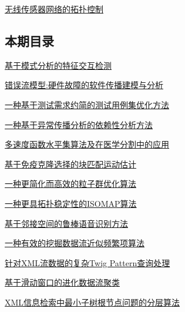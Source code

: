 \documentclass[a4paper]{article}
\begin{document}
\href{http://www.jos.org.cn/ch/reader/download_pdf.aspx?file_no=20070416&year_id=2007&quarter_id=4&falg=1}{无线传感器网络的拓扑控制}

\subsection{本期目录}
\href{http://www.jos.org.cn/ch/reader/download_pdf.aspx?file_no=20070402&year_id=2007&quarter_id=4&falg=1}{基于模式分析的特征交互检测}

\href{http://www.jos.org.cn/ch/reader/download_pdf.aspx?file_no=20070403&year_id=2007&quarter_id=4&falg=1}{错误流模型:硬件故障的软件传播建模与分析}

\href{http://www.jos.org.cn/ch/reader/download_pdf.aspx?file_no=20070404&year_id=2007&quarter_id=4&falg=1}{一种基于测试需求约简的测试用例集优化方法}

\href{http://www.jos.org.cn/ch/reader/download_pdf.aspx?file_no=20070405&year_id=2007&quarter_id=4&falg=1}{一种基于异常传播分析的依赖性分析方法}

\href{http://www.jos.org.cn/ch/reader/download_pdf.aspx?file_no=20070406&year_id=2007&quarter_id=4&falg=1}{多速度函数水平集算法及在医学分割中的应用}

\href{http://www.jos.org.cn/ch/reader/download_pdf.aspx?file_no=20070407&year_id=2007&quarter_id=4&falg=1}{基于免疫克隆选择的块匹配运动估计}

\href{http://www.jos.org.cn/ch/reader/download_pdf.aspx?file_no=20070408&year_id=2007&quarter_id=4&falg=1}{一种更简化而高效的粒子群优化算法}

\href{http://www.jos.org.cn/ch/reader/download_pdf.aspx?file_no=20070409&year_id=2007&quarter_id=4&falg=1}{一种更具拓扑稳定性的ISOMAP算法}

\href{http://www.jos.org.cn/ch/reader/download_pdf.aspx?file_no=20070410&year_id=2007&quarter_id=4&falg=1}{基于邻接空间的鲁棒语音识别方法}

\href{http://www.jos.org.cn/ch/reader/download_pdf.aspx?file_no=20070411&year_id=2007&quarter_id=4&falg=1}{一种有效的挖掘数据流近似频繁项算法}

\href{http://www.jos.org.cn/ch/reader/download_pdf.aspx?file_no=20070412&year_id=2007&quarter_id=4&falg=1}{针对XML流数据的复杂Twig Pattern查询处理}

\href{http://www.jos.org.cn/ch/reader/download_pdf.aspx?file_no=20070413&year_id=2007&quarter_id=4&falg=1}{基于滑动窗口的进化数据流聚类}

\href{http://www.jos.org.cn/ch/reader/download_pdf.aspx?file_no=20070414&year_id=2007&quarter_id=4&falg=1}{XML信息检索中最小子树根节点问题的分层算法}
\end{document}
